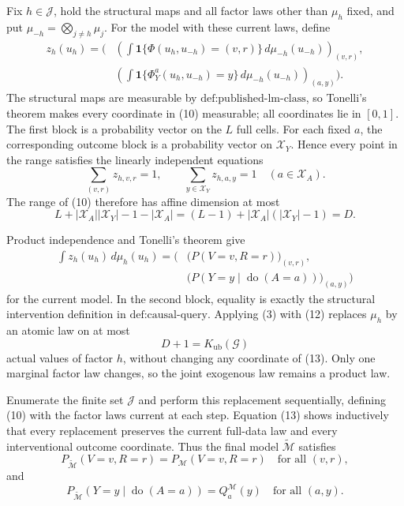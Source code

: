 Fix \(h\in\mathcal J\), hold the structural maps and all factor laws other than \(\mu_h\) fixed, and put \(\mu_{-h}=\bigotimes_{j\neq h}\mu_j\). For the model with these current laws, define
\[
\begin{aligned}
z_h(u_h)=\Bigg(&
\left(
\int\mathbf 1\{\Phi(u_h,u_{-h})=(v,r)\}\,d\mu_{-h}(u_{-h})
\right)_{(v,r)},\\
&\left(
\int\mathbf 1\{\Phi_Y^a(u_h,u_{-h})=y\}\,d\mu_{-h}(u_{-h})
\right)_{(a,y)}
\Bigg).
\end{aligned}
\tag{10}
\]
The structural maps are measurable by \(\text{def:published-lm-class}\), so Tonelli's theorem makes every coordinate in (10) measurable; all coordinates lie in \([0,1]\). The first block is a probability vector on the \(L\) full cells. For each fixed \(a\), the corresponding outcome block is a probability vector on \(\mathcal X_Y\). Hence every point in the range satisfies the linearly independent equations
\[
\sum_{(v,r)}z_{h,v,r}=1,
\qquad
\sum_{y\in\mathcal X_Y}z_{h,a,y}=1
\quad(a\in\mathcal X_A).
\tag{11}
\]
The range of (10) therefore has affine dimension at most
\[
L+|\mathcal X_A||\mathcal X_Y|-1-|\mathcal X_A|
=(L-1)+|\mathcal X_A|(|\mathcal X_Y|-1)=D.
\tag{12}
\]

Product independence and Tonelli's theorem give
\[
\begin{aligned}
\int z_h(u_h)\,d\mu_h(u_h)
=\Big(&\bigl(P(V=v,R=r)\bigr)_{(v,r)},\\
&\bigl(P(Y=y\mid\operatorname{do}(A=a))\bigr)_{(a,y)}\Big)
\end{aligned}
\tag{13}
\]
for the current model. In the second block, equality is exactly the structural intervention definition in \(\text{def:causal-query}\). Applying (3) with (12) replaces \(\mu_h\) by an atomic law on at most
\[
D+1=K_{\mathrm{ub}}(\mathcal G)
\tag{14}
\]
actual values of factor \(h\), without changing any coordinate of (13). Only one marginal factor law changes, so the joint exogenous law remains a product law.

Enumerate the finite set \(\mathcal J\) and perform this replacement sequentially, defining (10) with the factor laws current at each step. Equation (13) shows inductively that every replacement preserves the current full-data law and every interventional outcome coordinate. Thus the final model \(\widetilde{\mathcal M}\) satisfies
\[
P_{\widetilde{\mathcal M}}(V=v,R=r)=P_{\mathcal M}(V=v,R=r)
\quad\text{for all }(v,r),
\tag{15}
\]
and
\[
P_{\widetilde{\mathcal M}}(Y=y\mid\operatorname{do}(A=a))
=Q_a^{\mathcal M}(y)
\quad\text{for all }(a,y).
\tag{16}
\]

